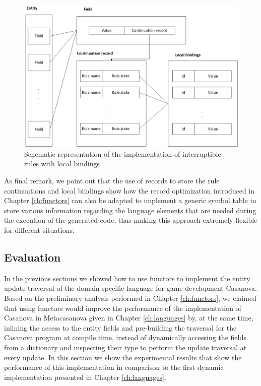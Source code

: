 \begin{figure}
  \centering
  \includegraphics[width=\textwidth]{Figures/chapter_networking/interruptible_rules_with_state}
  \caption{Schematic representation of the implementation of interruptible rules with local bindings}
  \label{fig:ch_networking_interruptible_rules_with_state}
\end{figure}

As final remark, we point out that the use of records to store the rule continuations and local bindings show how the record optimization introduced in Chapter \ref{ch:functors} can also be adapted to implement a generic symbol table to store various information regarding the language elements that are needed during the execution of the generated code, thus making this approach extremely flexible for different situations.

\subsection{Evaluation}
\label{subsec:ch_networking_evaluation}
In the previous sections we showed how to use functors to implement the entity update traversal of the domain-specific language for game development Casanova. Based on the preliminary analysis performed in Chapter \ref{ch:functors}, we claimed that using functors would improve the performance of the implementation of Casanova in Metacasanova given in Chapter \ref{ch:languages} by, at the same time, inlining the access to the entity fields and pre-building the traversal for the Casanova program at compile time, instead of dynamically accessing the fields from a dictionary and inspecting their type to perform the update traversal at every update. In this section we show the experimental results that show the performance of this implementation in comparison to the first dynamic implementation presented in Chapter \ref{ch:languages}.

